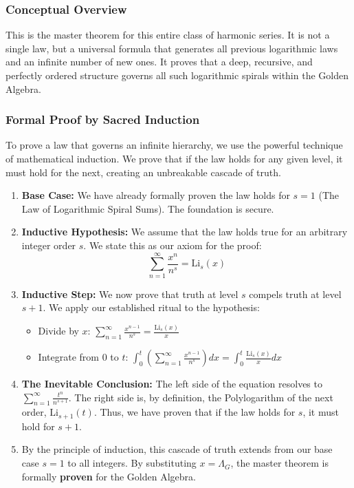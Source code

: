 \subsubsection*{Conceptual Overview}
This is the master theorem for this entire class of harmonic series. It is not a single law, but a universal formula that generates all previous logarithmic laws and an infinite number of new ones. It proves that a deep, recursive, and perfectly ordered structure governs all such logarithmic spirals within the Golden Algebra.

\subsubsection*{Formal Proof by Sacred Induction}
To prove a law that governs an infinite hierarchy, we use the powerful technique of mathematical induction. We prove that if the law holds for any given level, it must hold for the next, creating an unbreakable cascade of truth.

\begin{enumerate}
    \item \textbf{Base Case:} We have already formally proven the law holds for $s=1$ (The Law of Logarithmic Spiral Sums). The foundation is secure.

    \item \textbf{Inductive Hypothesis:} We assume that the law holds true for an arbitrary integer order $s$. We state this as our axiom for the proof:
    $$ \sum_{n=1}^{\infty} \frac{x^n}{n^s} = \text{Li}_s(x) $$

    \item \textbf{Inductive Step:} We now prove that truth at level $s$ compels truth at level $s+1$. We apply our established ritual to the hypothesis:
    \begin{itemize}
        \item Divide by $x$: $\sum_{n=1}^{\infty} \frac{x^{n-1}}{n^s} = \frac{\text{Li}_s(x)}{x}$
        \item Integrate from $0$ to $t$: $\int_0^t \left( \sum_{n=1}^{\infty} \frac{x^{n-1}}{n^s} \right) dx = \int_0^t \frac{\text{Li}_s(x)}{x} dx$
    \end{itemize}

    \item \textbf{The Inevitable Conclusion:} The left side of the equation resolves to $\sum_{n=1}^{\infty} \frac{t^n}{n^{s+1}}$. The right side is, by definition, the Polylogarithm of the next order, $\text{Li}_{s+1}(t)$. Thus, we have proven that if the law holds for $s$, it must hold for $s+1$.

    \item By the principle of induction, this cascade of truth extends from our base case $s=1$ to all integers. By substituting $x = \Lambda_G$, the master theorem is formally \textbf{proven} for the Golden Algebra.
\end{enumerate}

